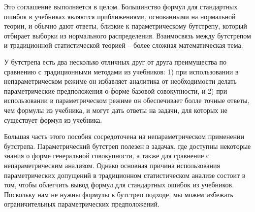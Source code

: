 Это соглашение выполняется в целом. Большинство формул для стандартных ошибок в учебниках являются приближениями, основанными на нормальной теории, и обычно дают ответы, близкие к параметрическому бутстрепу, который отбирает выборки из нормального распределения. Взаимосвязь между бутстрепом и традиционной статистической теорией -- более сложная математическая тема.

У бутстрепа есть два несколько отличных друг от друга преимущества по сравнению с традиционными методами из учебников: 1) при использовании в непараметрическом режиме он избавляет аналитика от необходимости делать параметрические предположения о форме базовой совокупности, и 2) при использовании в параметрическом режиме он обеспечивает болле точные ответы, чем формулы из учебника, и могут дать ответы на задачи, для которых не существует формул из учебника. 

Большая часть этого пособия сосредоточена на непараметрическом применении бутстрепа. Параметрический бутстреп полезен в задачах, где доступны некоторые знания о форме генеральной совокупности, а также для сравнение с непараметрическим анализом. Однако основная причина использования параметрических допущений в традиционном статистическом анализе состоит в том, чтобы облегчить вывод формул для стандартных ошибок из учебников. Поскольку нам не нужны формулы в бутстреп подходе, мы можем избежать ограничительных параметрических предположений. 
